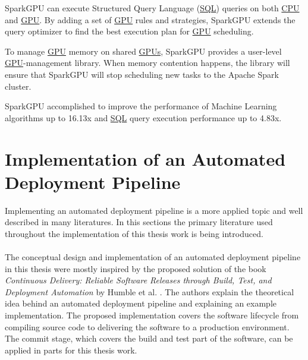 SparkGPU can execute Structured Query Language (\hyperlink{abbr:sql}{SQL}) queries on both \hyperlink{abbr:cpu}{CPU} and \hyperlink{abbr:gpu}{GPU}.
By adding a set of \hyperlink{abbr:gpu}{GPU} rules and strategies, SparkGPU extends the query optimizer to find the best execution plan for \hyperlink{abbr:gpu}{GPU} scheduling.

To manage \hyperlink{abbr:gpu}{GPU} memory on shared \hyperlink{abbr:gpu}{GPUs}, SparkGPU provides a user-level \hyperlink{abbr:gpu}{GPU}-management library.
When memory contention happens, the library will ensure that SparkGPU will stop scheduling new tasks to the Apache Spark cluster.

SparkGPU accomplished to improve the performance of Machine Learning algorithms up to 16.13x and \hyperlink{abbr:sql}{SQL} query execution performance up to 4.83x.


\section{Implementation of an Automated Deployment Pipeline}
Implementing an automated deployment pipeline is a more applied topic and well described in many literatures. In this sections the primary literature used throughout the implementation of this thesis work is being introduced.


\paragraph{}The conceptual design and implementation of an automated deployment pipeline in this thesis were mostly inspired by the proposed solution of the book \textit{Continuous Delivery: Reliable Software Releases through Build, Test, and Deployment Automation} by Humble et al. \cite{Farley2010CI}.
The authors explain the theoretical idea behind an automated deployment pipeline and explaining an example implementation.
The proposed implementation covers the software lifecycle from compiling source code to delivering the software to a production environment.
The commit stage, which covers the build and test part of the software, can be applied in parts for this thesis work.
